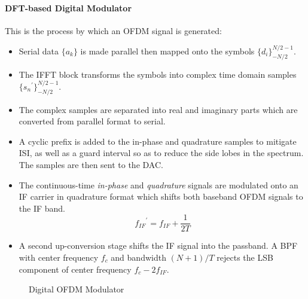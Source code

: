 \paragraph{DFT-based Digital Modulator} This is the process by which an OFDM signal is generated:
\begin{itemize}
	\item Serial data \(\{a_k\}\) is made parallel then mapped onto the symbols \(\{d_i\}_{-N/2}^{N/2-1}\).
	\item The \gls{IFFT} block transforms the symbols into complex time domain samples \(\{{s_n}^\prime\}_{-N/2}^{N/2-1}\).
	\item The complex samples are separated into real and imaginary parts which are converted from parallel format to serial.
	\item A cyclic prefix is added to the in-phase and quadrature samples to mitigate \gls{ISI}, as well as a guard interval so as to reduce the side lobes in the spectrum. The samples are then sent to the \gls{DAC}.
	\item The continuous-time \emph{in-phase} and \emph{quadrature} signals are modulated onto an \gls{IF} carrier in quadrature format which shifts both baseband \gls{OFDM} signals to the \gls{IF} band.
		\begin{equation}
			{f_{IF}}^\prime = f_{IF} + \frac{1}{2T}
		\end{equation}
		\begin{mathDef}
		\end{mathDef}
	\item A second up-conversion stage shifts the \gls{IF} signal into the passband. A \gls{BPF} with center frequency \(f_c\) and bandwidth \((N+1)/T\) rejects the \gls{LSB} component of center frequency \(f_c - 2f_{IF}\).
\end{itemize}
\begin{figure}[!h]
	\centering
	\resizebox{\textwidth}{!}{
		
	}
	\caption{Digital OFDM Modulator}
\end{figure}
